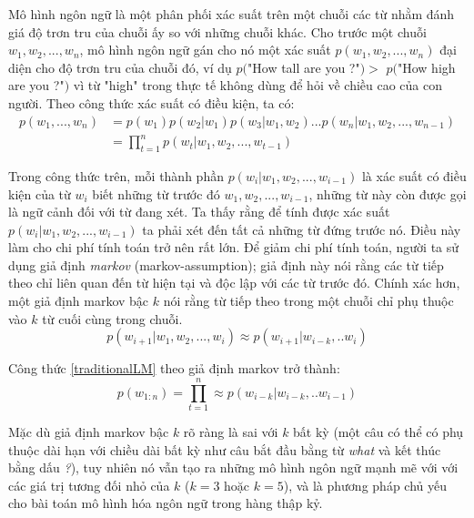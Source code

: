 Mô hình ngôn ngữ là một phân phối xác suất trên một chuỗi các từ nhằm đánh giá độ trơn tru của chuỗi ấy so với những chuỗi khác. Cho trước một chuỗi $w_1,w_2,...,w_n$, mô hình ngôn ngữ gán cho nó một xác suất $p(w_1,w_2,...,w_n)$ đại diện cho độ trơn tru của chuỗi đó, ví dụ $p($"How tall are you ?"$) >$ $p($"How high are you ?"$)$ vì từ "high" trong thực tế không dùng để hỏi về chiều cao của con người. Theo công thức xác suất có điều kiện, ta có:
\begin{equation} \label{traditionalLM}
\begin{split}
	p(w_1,...,w_n) &= p(w_1)p(w_2|w_1)p(w_3|w_1,w_2)...p(w_n|w_1,w_2,...,w_{n-1}) \\
				&= \prod_{t=1}^{n} p(w_t|w_1,w_2,...,w_{t-1})
\end{split}
\end{equation}
 
Trong công thức trên, mỗi thành phần $p(w_i|w_1,w_2,...,w_{i-1})$ là xác suất có điều kiện của từ $w_i$ biết những từ trước đó $w_1,w_2,...,w_{i-1}$, những từ này còn được gọi là ngữ cảnh đối với từ đang xét. Ta thấy rằng để tính được xác suất $p(w_i|w_1,w_2,...,w_{i-1})$ ta phải xét đến tất cả những từ đứng trước nó. Điều này làm cho chi phí tính toán trở nên rất lớn. Để giảm chi phí tính toán, người ta sử dụng giả định \textit{markov} (markov-assumption); giả định này nói rằng các từ tiếp theo chỉ liên quan đến từ hiện tại và độc lập với các từ trước đó. Chính xác hơn, một giả định markov bậc $k$ nói rằng từ tiếp theo trong một chuỗi chỉ phụ thuộc vào $k$ từ cuối cùng trong chuỗi.
\begin{equation} \label{markovAssumption}
	p(w_{i+1}|w_1,w_2,...,w_{i}) \approx p(w_{i+1}|w_{i-k},..w_{i})
\end{equation}

Công thức \ref{traditionalLM} theo giả định markov trở thành:
\begin{equation} \label{traditionalLM}
	p(w_{1:n}) = \prod_{t=1}^{n} \approx p(w_{i-k}|w_{i-k},..w_{i-1})
\end{equation}

Mặc dù giả định markov bậc $k$ rõ ràng là sai với $k$ bất kỳ (một câu có thể có phụ thuộc dài hạn với chiều dài bất kỳ như câu bắt đầu bằng từ \textit{what} và kết thúc bằng dấu \textit{?}), tuy nhiên nó vẫn tạo ra những mô hình ngôn ngữ mạnh mẽ với với các giá trị tương đối nhỏ của $k$ ($k=3$ hoặc $k=5$), và là phương pháp chủ yếu cho bài toán mô hình hóa ngôn ngữ trong hàng thập kỷ.

